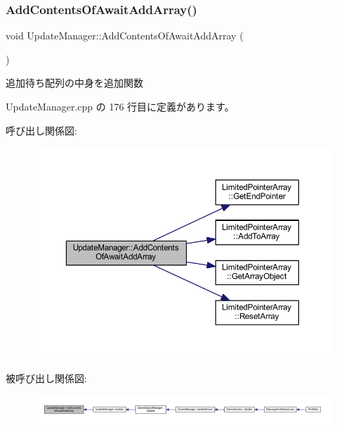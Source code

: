 \subsubsection{\texorpdfstring{Add\+Contents\+Of\+Await\+Add\+Array()}{AddContentsOfAwaitAddArray()}}
{\footnotesize\ttfamily void Update\+Manager\+::\+Add\+Contents\+Of\+Await\+Add\+Array (\begin{DoxyParamCaption}{ }\end{DoxyParamCaption})\hspace{0.3cm}{\ttfamily [private]}}



追加待ち配列の中身を追加関数 



 Update\+Manager.\+cpp の 176 行目に定義があります。

呼び出し関係図\+:\nopagebreak
\begin{figure}[H]
\begin{center}
\leavevmode
\includegraphics[width=350pt]{class_update_manager_a7bb1af3bffcc4d72333ac86ae411891e_cgraph}
\end{center}
\end{figure}
被呼び出し関係図\+:
\nopagebreak
\begin{figure}[H]
\begin{center}
\leavevmode
\includegraphics[width=350pt]{class_update_manager_a7bb1af3bffcc4d72333ac86ae411891e_icgraph}
\end{center}
\end{figure}
\mbox{\label{class_update_manager_afe4b39d94cde8294cc273cde32788eaa}} 
